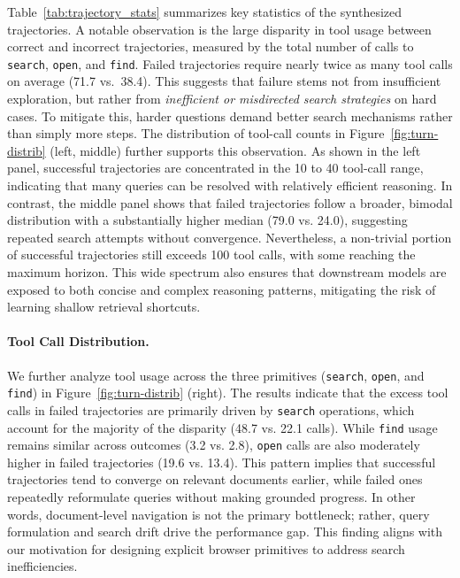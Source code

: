 Table~\ref{tab:trajectory_stats} summarizes key statistics of the synthesized trajectories. A notable observation is the large disparity in tool usage between correct and incorrect trajectories, measured by the total number of calls to \texttt{search}, \texttt{open}, and \texttt{find}. Failed trajectories require nearly twice as many tool calls on average (71.7 vs.\ 38.4). This suggests that failure stems not from insufficient exploration, but rather from \textit{inefficient or misdirected search strategies} on hard cases. To mitigate this, harder questions demand better search mechanisms rather than simply more steps. The distribution of tool-call counts in Figure~\ref{fig:turn-distrib} (left, middle) further supports this observation. As shown in the left panel, successful trajectories are concentrated in the 10 to 40 tool-call range, indicating that many queries can be resolved with relatively efficient reasoning. In contrast, the middle panel shows that failed trajectories follow a broader, bimodal distribution with a substantially higher median (79.0 vs. 24.0), suggesting repeated search attempts without convergence. Nevertheless, a non-trivial portion of successful trajectories still exceeds 100 tool calls, with some reaching the maximum horizon. This wide spectrum also ensures that downstream models are exposed to both concise and complex reasoning patterns, mitigating the risk of learning shallow retrieval shortcuts. 

\paragraph{Tool Call Distribution.}
We further analyze tool usage across the three primitives (\texttt{search}, \texttt{open}, and \texttt{find}) in Figure~\ref{fig:turn-distrib} (right). The results indicate that the excess tool calls in failed trajectories are primarily driven by \texttt{search} operations, which account for the majority of the disparity (48.7 vs. 22.1 calls). While \texttt{find} usage remains similar across outcomes (3.2 vs. 2.8), \texttt{open} calls are also moderately higher in failed trajectories (19.6 vs. 13.4). This pattern implies that successful trajectories tend to converge on relevant documents earlier, while failed ones repeatedly reformulate queries without making grounded progress. In other words, document-level navigation is not the primary bottleneck; rather, query formulation and search drift drive the performance gap. This finding aligns with our motivation for designing explicit browser primitives to address search inefficiencies.

